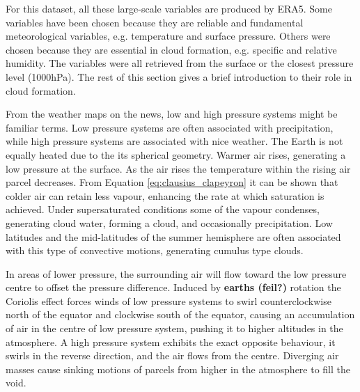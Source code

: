 For this dataset, all these large-scale variables are produced by ERA5. Some variables have been chosen because they are reliable and fundamental meteorological variables, e.g. temperature and surface pressure. Others were chosen because they are essential in cloud formation, e.g. specific and relative humidity. The variables were all retrieved from the surface or the closest pressure level (1000hPa). The rest of this section gives a brief introduction to their role in cloud formation.

From the weather maps on the news, low and high pressure systems might be familiar terms. Low pressure systems are often associated with precipitation, while high pressure systems are associated with nice weather. The Earth is not equally heated due to the its spherical geometry. Warmer air rises, generating a low pressure at the surface. As the air rises the temperature within the rising air parcel decreases. From Equation \eqref{eq:clausius_clapeyron} it can be shown that colder air can retain less vapour, enhancing the rate at which saturation is achieved. Under supersaturated conditions some of the vapour condenses, generating cloud water, forming a cloud, and occasionally precipitation. Low latitudes and the mid-latitudes of the summer hemisphere are often associated with this type of convective motions, generating cumulus type clouds. 

In areas of lower pressure, the surrounding air will flow toward the low pressure centre to offset the pressure difference. Induced by \textbf{earths (feil?)} rotation the Coriolis effect forces winds of low pressure systems to swirl counterclockwise north of the equator and clockwise south of the equator, causing an accumulation of air in the centre of low pressure system, pushing it to higher altitudes in the atmosphere. A high pressure system exhibits the exact opposite behaviour, it swirls in the reverse direction, and the air flows from the centre. Diverging air masses cause sinking motions of parcels from higher in the atmosphere to fill the void. 

